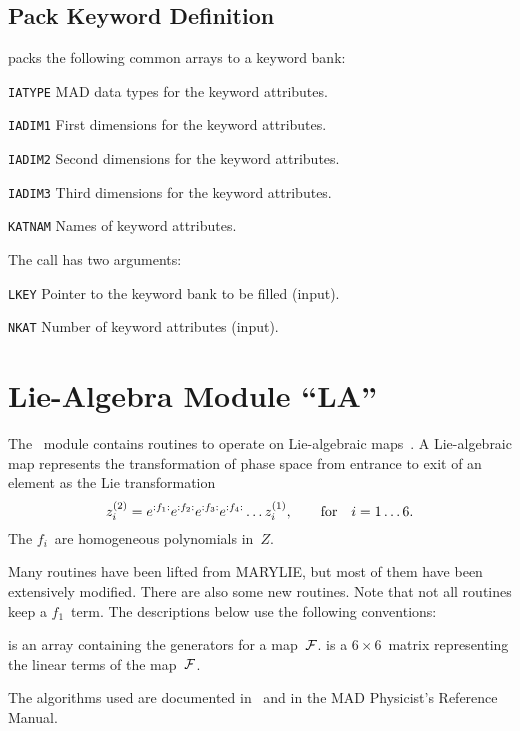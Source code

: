 \section{Pack Keyword Definition}
\label{KWPUT}
packs the following common arrays to a keyword bank:
\begin{mylist}
\item[\tt IATYPE]
MAD data types for the keyword attributes. 
\item[\tt IADIM1]
First dimensions for the keyword attributes.
\item[\tt IADIM2]
Second dimensions for the keyword attributes.
\item[\tt IADIM3]
Third dimensions for the keyword attributes.
\item[\tt KATNAM]
Names of keyword attributes.
\end{mylist}
The call has two arguments:
\begin{mylist}
\item[\tt LKEY]
Pointer to the keyword bank to be filled (input).
\item[\tt NKAT]
Number of keyword attributes (input).
\end{mylist}


\chapter{Lie-Algebra Module ``LA''}
\label{LA}
The ~module contains routines to operate on Lie-algebraic
maps~\cite{DRAGT}.
A Lie-algebraic map represents the transformation of phase space
from entrance to exit of an element as the Lie transformation
\[
z^{(2)}_i = e^{{:}{f_1}{:}} e^{{:}{f_2}{:}} e^{{:}{f_3}{:}} e^{{:}{f_4}{:}}
        \ldots z^{(1)}_i,\qquad {\rm for} \quad i = 1 \ldots 6.
\]
The $f_i$~are homogeneous polynomials in~$Z$.

Many routines have been lifted from MARYLIE,
but most of them have been extensively modified.
There are also some new routines.
Note that not all routines keep a $f_1$~term.
The descriptions below use the following conventions:
\begin{mylist}
 is an array containing the generators for a map~$\cal F$.
 is a $6\times6$~matrix representing the linear terms of
the map~$\cal F$.
\end{mylist}
The algorithms used are documented in~\cite{DRAGT} and in the MAD
Physicist's Reference Manual.

